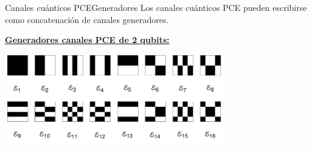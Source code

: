 \documentclass[xcolor=dvipsnames,presentation]{beamer}%
\begin{document}
\begin{frame}{Canales cuánticos PCE}{Generadores}
Los canales cuánticos PCE pueden escribirse como concatenación 
de canales generadores.

\vfill
\small{\textbf{\underline{Generadores canales PCE de 2 qubits:}}}

\begin{center}
\includegraphics[height=4cm]{2qubits_pce_generators}
\end{center}

\end{frame}
\end{document}

